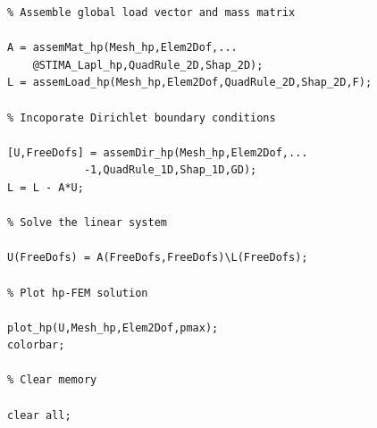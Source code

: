 \begin{lstlisting}
% Assemble global load vector and mass matrix

A = assemMat_hp(Mesh_hp,Elem2Dof,...
	@STIMA_Lapl_hp,QuadRule_2D,Shap_2D);
L = assemLoad_hp(Mesh_hp,Elem2Dof,QuadRule_2D,Shap_2D,F);

% Incoporate Dirichlet boundary conditions
  
[U,FreeDofs] = assemDir_hp(Mesh_hp,Elem2Dof,...
			-1,QuadRule_1D,Shap_1D,GD);
L = L - A*U;
  
% Solve the linear system
  
U(FreeDofs) = A(FreeDofs,FreeDofs)\L(FreeDofs);
 
% Plot hp-FEM solution

plot_hp(U,Mesh_hp,Elem2Dof,pmax);
colorbar;
  
% Clear memory
  
clear all;
\end{lstlisting}

